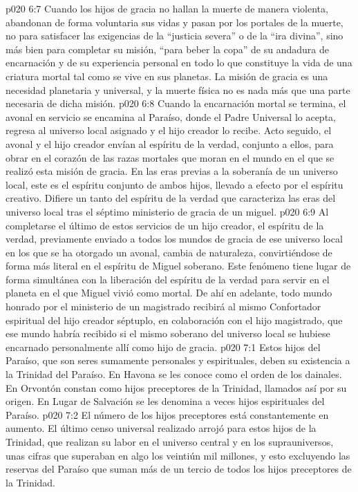 \vs p020 6:7 Cuando los hijos de gracia no hallan la muerte de manera violenta, abandonan de forma voluntaria sus vidas y pasan por los portales de la muerte, no para satisfacer las exigencias de la “justicia severa” o de la “ira divina”, sino más bien para completar su misión, “para beber la copa” de su andadura de encarnación y de su experiencia personal en todo lo que constituye la vida de una criatura mortal tal como se vive en sus planetas. La misión de gracia es una necesidad planetaria y universal, y la muerte física no es nada más que una parte necesaria de dicha misión.
\vs p020 6:8 Cuando la encarnación mortal se termina, el avonal en servicio se encamina al Paraíso, donde el Padre Universal lo acepta, regresa al universo local asignado y el hijo creador lo recibe. Acto seguido, el avonal y el hijo creador envían al espíritu de la verdad, conjunto a ellos, para obrar en el corazón de las razas mortales que moran en el mundo en el que se realizó esta misión de gracia. En las eras previas a la soberanía de un universo local, este es el espíritu conjunto de ambos hijos, llevado a efecto por el espíritu creativo. Difiere un tanto del espíritu de la verdad que caracteriza las eras del universo local tras el séptimo ministerio de gracia de un miguel.
\vs p020 6:9 Al completarse el último de estos servicios de un hijo creador, el espíritu de la verdad, previamente enviado a todos los mundos de gracia de ese universo local en los que se ha otorgado un avonal, cambia de naturaleza, convirtiéndose de forma más literal en el espíritu de Miguel soberano. Este fenómeno tiene lugar de forma simultánea con la liberación del espíritu de la verdad para servir en el planeta en el que Miguel vivió como mortal. De ahí en adelante, todo mundo honrado por el ministerio de un magistrado recibirá al mismo Confortador espiritual del hijo creador séptuplo, en colaboración con el hijo magistrado, que ese mundo habría recibido si el mismo soberano del universo local se hubiese encarnado personalmente allí como hijo de gracia.
\vs p020 7:1 Estos hijos del Paraíso, que son seres sumamente personales y espirituales, deben su existencia a la Trinidad del Paraíso. En Havona se les conoce como el orden de los dainales. En Orvontón constan como hijos preceptores de la Trinidad, llamados así por su origen. En Lugar de Salvación se les denomina a veces hijos espirituales del Paraíso.
\vs p020 7:2 El número de los hijos preceptores está constantemente en aumento. El último censo universal realizado arrojó para estos hijos de la Trinidad, que realizan su labor en el universo central y en los suprauniversos, unas cifras que superaban en algo los veintiún mil millones, y esto excluyendo las reservas del Paraíso que suman más de un tercio de todos los hijos preceptores de la Trinidad.
